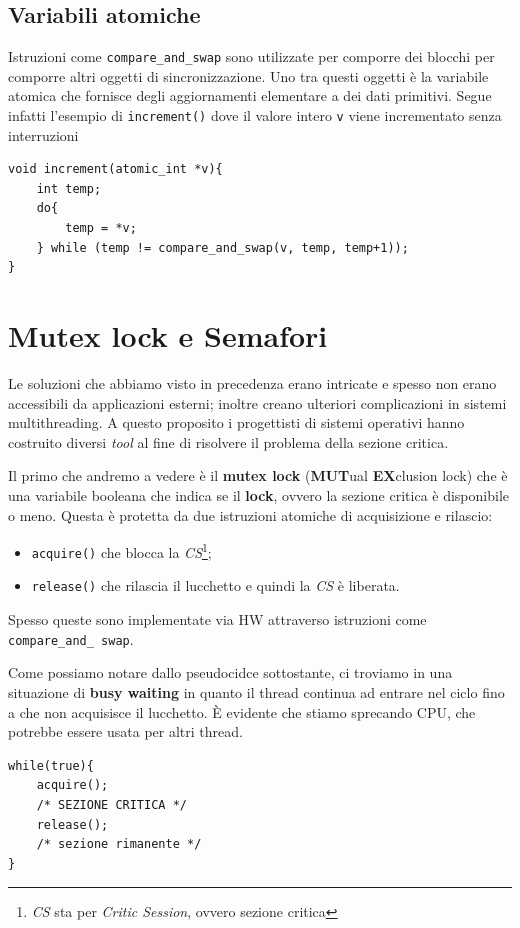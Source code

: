 % 
\subsection{Variabili atomiche}
Istruzioni come \texttt{compare\_and\_swap} sono utilizzate per comporre dei blocchi per comporre altri oggetti di sincronizzazione. Uno tra questi oggetti è la variabile atomica che fornisce degli aggiornamenti elementare a dei dati primitivi. Segue infatti l'esempio di \texttt{increment()} dove il valore intero \texttt{v} viene incrementato senza interruzioni
\begin{lstlisting}[caption={Esempio di una variabile atomica \texttt{increment()}}]
void increment(atomic_int *v){
    int temp;
    do{
        temp = *v;
    } while (temp != compare_and_swap(v, temp, temp+1));
}
\end{lstlisting}
% 
\section{Mutex lock e Semafori}
Le soluzioni che abbiamo visto in precedenza erano intricate e spesso non erano accessibili da applicazioni esterni; inoltre creano ulteriori complicazioni in sistemi multithreading. A questo proposito i progettisti di sistemi operativi hanno costruito diversi \textit{tool} al fine di risolvere il problema della sezione critica.

Il primo che andremo a vedere è il \textbf{mutex lock} (\textbf{MUT}ual \textbf{EX}clusion lock) che è una variabile booleana che indica se il \textbf{lock}, ovvero la sezione critica è disponibile o meno. Questa è protetta da due istruzioni atomiche di acquisizione e rilascio:
\vspace{-5px}
\begin{itemize}
\setlength{\itemsep}{-.15 em}
    \item \texttt{acquire()} che blocca la \textit{CS}\footnote{\textit{CS} sta per \textit{Critic Session}, ovvero sezione critica};
    \item \texttt{release()} che rilascia il lucchetto e quindi la \textit{CS} è liberata.
\end{itemize}
Spesso queste sono implementate via HW attraverso istruzioni come \texttt{compare\_and\_ swap}.

Come possiamo notare dallo pseudocidce sottostante, ci troviamo in una situazione di \textbf{busy waiting} in quanto il thread continua ad entrare nel ciclo fino a che non acquisisce il lucchetto. È evidente che stiamo sprecando CPU, che potrebbe essere usata per altri thread.
\begin{lstlisting}
while(true){
    acquire();
    /* SEZIONE CRITICA */
    release();
    /* sezione rimanente */
}
\end{lstlisting}

